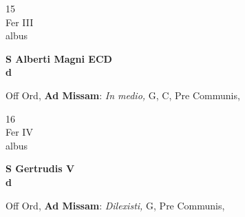 \documentclass[10pt, openany]{book}
\begin{document}
        \begin{center}
            \begin{minipage}{3.5in}
                \vspace{2em}
                \begin{minipage}{0.5in}
                    {\Huge 15} \\
                    {\normalsize Fer III} \\
                    {\normalsize albus}
                \end{minipage}
                \begin{minipage}{3.0in}
                    \textbf{ \large S Alberti Magni ECD \\
                    \textnormal{\normalsize d}} \\ 
                \end{minipage}
                \begin{justify}Off Ord, \textbf{Ad Missam}: \textit{In medio,} G, C, Pre Communis,   
                \end{justify}
            \end{minipage}
        \end{center}
    
        \begin{center}
            \begin{minipage}{3.5in}
                \vspace{2em}
                \begin{minipage}{0.5in}
                    {\Huge 16} \\
                    {\normalsize Fer IV} \\
                    {\normalsize albus}
                \end{minipage}
                \begin{minipage}{3.0in}
                    \textbf{ \large S Gertrudis V \\
                    \textnormal{\normalsize d}} \\ 
                \end{minipage}
                \begin{justify}Off Ord, \textbf{Ad Missam}: \textit{Dilexisti,} G, Pre Communis,   
                \end{justify}
            \end{minipage}
        \end{center}
    
\end{document}
